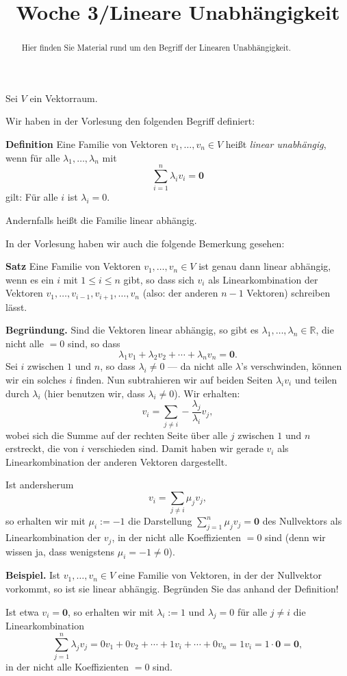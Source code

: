 \documentclass{ximera}
\title{Woche 3/Lineare Unabhängigkeit}
\begin{document}
\begin{abstract}
Hier finden Sie Material rund um den Begriff der Linearen Unabhängigkeit.
\end{abstract}
\maketitle

Sei $V$ ein Vektorraum.

Wir haben in der Vorlesung den folgenden Begriff definiert:

\textbf{Definition}
Eine Familie von Vektoren $v_1,\dots, v_n\in V$ heißt \emph{linear unabhängig}, wenn für alle $\lambda_1,\dots, \lambda_n$ mit
\[
\sum_{i=1}^n \lambda_iv_i = \mathbf{0}
\]
gilt: Für alle $i$ ist $\lambda_i = 0$.

Andernfalls heißt die Familie linear abhängig.
\bigskip

In der Vorlesung haben wir auch die folgende Bemerkung gesehen:

\textbf{Satz}
Eine Familie von Vektoren $v_1,\dots, v_n\in V$ ist genau dann linear abhängig, wenn es ein $i$ mit $1\le i\le n$ gibt, so dass sich $v_i$ als Linearkombination der Vektoren $v_1, \dots, v_{i-1}, v_{i+1}, \dots, v_n$ (also: der anderen $n-1$ Vektoren) schreiben lässt.
\bigskip

\textbf{Begründung.} Sind die Vektoren linear abhängig, so gibt es $\lambda_1, \dots, \lambda_n\in \mathbb R$, die nicht alle $=0$ sind, so dass
\[
\lambda_1v_1 + \lambda_2 v_2 + \cdots + \lambda_nv_n = \mathbf{0}.
\]
Sei $i$ zwischen $1$ und $n$, so dass $\lambda_i \ne 0$ --- da nicht alle $\lambda$'s verschwinden, können wir ein solches $i$ finden. Nun subtrahieren wir auf beiden Seiten $\lambda_iv_i$ und teilen durch $\lambda_i$ (hier benutzen wir, dass $\lambda_i\ne 0$). Wir erhalten:
\[
v_i = \sum_{j\ne i} -\frac{\lambda_j}{\lambda_i} v_j,
\]
wobei sich die Summe auf der rechten Seite über alle $j$ zwischen $1$ und $n$ erstreckt, die von $i$ verschieden sind. Damit haben wir gerade $v_i$ als Linearkombination der anderen Vektoren dargestellt.

Ist andersherum
\[
v_i = \sum_{j\ne i} \mu_j v_j,
\]
so erhalten wir mit $\mu_i := -1$ die Darstellung $\sum_{j=1}^n \mu_j v_j = \mathbf{0}$ des Nullvektors als Linearkombination der $v_j$, in der nicht alle Koeffizienten $=0$ sind (denn wir wissen ja, dass wenigstens $\mu_i = -1 \ne 0$).
\bigskip


\begin{question}
\textbf{Beispiel.} Ist $v_1,\dots, v_n\in V$ eine Familie von Vektoren, in der der Nullvektor vorkommt, so ist sie linear abhängig. Begründen Sie das anhand der Definition!
\begin{solution}
\begin{free-response}
Ist etwa $v_i =\mathbf{0}$, so erhalten wir mit $\lambda_i:=1$ und $\lambda_j=0$ für alle $j\ne i$ die Linearkombination
\[
\sum_{j=1}^n \lambda_j v_j = 0v_1 + 0v_2 + \cdots + 1v_i + \cdots + 0v_n = 1v_i = 1\cdot \mathbf{0} = \mathbf{0},
\]
in der nicht alle Koeffizienten $=0$ sind.
\end{free-response}
\end{solution}
\end{question}
\end{document}
